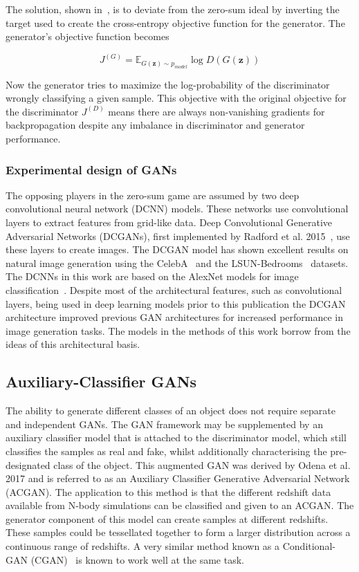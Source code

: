 \documentclass[twocolumn]{article}
\numberwithin{equation}{section}
\begin{document}
The solution, shown in~\cite{gf_gan}, is to deviate from the zero-sum ideal by inverting the target used to create the cross-entropy objective function for the generator. The generator's objective function becomes

\begin{equation}\label{eqn:J_G}
    J^{(G)} = \mathbb{E}_{G(\mathbf{z}) \sim p_{model}} \log D(G(\mathbf{z}))  
\end{equation}

Now the generator tries to maximize the log-probability of the discriminator wrongly classifying a given sample. This objective with the original objective for the discriminator $J^{(D)}$ means there are always non-vanishing gradients for backpropagation despite any imbalance in discriminator and generator performance. 

\subsubsection{Experimental design of GANs} 
The opposing players in the zero-sum game are assumed by two deep convolutional neural network (DCNN) models. These networks use convolutional layers to extract features from grid-like data. Deep Convolutional Generative Adversarial Networks (DCGANs), first implemented by Radford et al. 2015~\cite{dcgan}, use these layers to create images. The DCGAN model has shown excellent results on natural image generation using the CelebA~\cite{celebA} and the LSUN-Bedrooms~\cite{LSUN} datasets. The DCNNs in this work are based on the AlexNet models for image classification~\cite{dcnn}. Despite most of the architectural features, such as convolutional layers, being used in deep learning models prior to this publication the DCGAN architecture improved previous GAN architectures for increased performance in image generation tasks. 
The models in the methods of this work borrow from the ideas of this architectural basis.

\subsection{Auxiliary-Classifier GANs}
The ability to generate different classes of an object does not require separate and independent GANs. The GAN framework may be supplemented by an auxiliary classifier model that is attached to the discriminator model, which still classifies the samples as real and fake, whilst additionally characterising the pre-designated class of the object. This augmented GAN was derived by Odena et al. 2017 \cite{acgan} and is referred to as an Auxiliary Classifier Generative Adversarial Network (ACGAN). The application to this method is that the different redshift data available from N-body simulations can be classified and given to an ACGAN. The generator component of this model can create samples at different redshifts. These samples could be tessellated together to form a larger distribution across a continuous range of  redshifts. A very similar method known as a Conditional-GAN (CGAN)~\cite{cgan} is known to work well at the same task.
\end{document}
